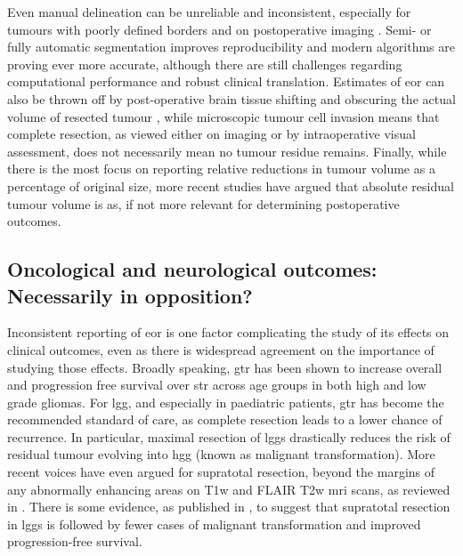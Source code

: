 Even manual delineation can be unreliable and inconsistent, especially for tumours with poorly defined borders and on postoperative imaging \autocite{Ertl-Wagner2009,Bo2017,Visser2019}.
Semi- or fully automatic segmentation improves reproducibility\autocite{Ertl-Wagner2009,Sezer2020} and modern algorithms are proving ever more accurate, although there are still challenges regarding computational performance and robust clinical translation\autocite{Angulakshmi2017,Wadhwa2019,Fawzi2021}.
Estimates of \gls{eor} can also be thrown off by post-operative brain tissue shifting and obscuring the actual volume of resected tumour \autocite{Schucht2014a}, while microscopic tumour cell invasion means that complete resection, as viewed either on imaging or by intraoperative visual assessment, does not necessarily mean no tumour residue remains\autocite{Yordanova2017}.
Finally, while there is the most focus on reporting relative reductions in tumour volume as a percentage of original size, more recent studies have argued that absolute residual tumour volume is as, if not more relevant for determining postoperative outcomes\autocite{Ius2012,Rincon-Torroella2019,Smith2008,Karschnia2021}.

\subsection{Oncological and neurological outcomes: Necessarily in opposition?}

Inconsistent reporting of \gls{eor} is one factor complicating the study of its effects on clinical outcomes, even as there is widespread agreement on the importance of studying those effects\autocite{Rincon-Torroella2019,Wykes2021,Weller2021}.
Broadly speaking, \gls{gtr} has been shown to increase overall and progression free survival over \gls{str} across age groups in both high \autocite{Hatoum2022, Han2020, Adams2016, McCrea2015, Bloch2012, McGirt2009, Kramm2006} and low grade \autocite{Keles2001, Pollack1995, Sanai2008} gliomas.
For \gls{lgg}, and especially in paediatric patients, \gls{gtr} has become the recommended standard of care, as complete resection leads to a lower chance of recurrence\autocite{Berger1994,Claus2005}.
In particular, maximal resection of \glspl{lgg} drastically reduces the risk of residual tumour evolving into \gls{hgg} (known as malignant transformation)\autocite{Duffau2013,Hervey-Jumper2016,Rincon-Torroella2019}.
More recent voices have even argued for supratotal resection, beyond the margins of any abnormally enhancing areas on T1w and FLAIR T2w \gls{mri} scans, as reviewed in \textcite{deLeeuw2019}.
There is some evidence, as published in \textcite{Yordanova2011}, to suggest that supratotal resection in \glspl{lgg} is followed by fewer cases of malignant transformation and improved progression-free survival.

